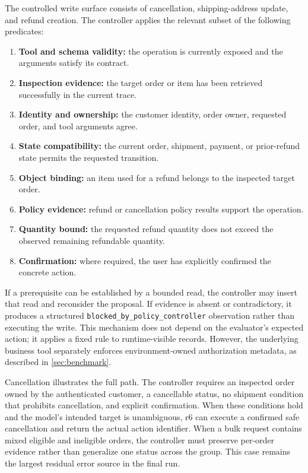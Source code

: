 \documentclass[11pt]{article}
\begin{document}
The controlled write surface consists of cancellation, shipping-address update, and refund creation. The controller applies the relevant subset of the following predicates:

\begin{enumerate}
  \item \textbf{Tool and schema validity:} the operation is currently exposed and the arguments satisfy its contract.
  \item \textbf{Inspection evidence:} the target order or item has been retrieved successfully in the current trace.
  \item \textbf{Identity and ownership:} the customer identity, order owner, requested order, and tool arguments agree.
  \item \textbf{State compatibility:} the current order, shipment, payment, or prior-refund state permits the requested transition.
  \item \textbf{Object binding:} an item used for a refund belongs to the inspected target order.
  \item \textbf{Policy evidence:} refund or cancellation policy results support the operation.
  \item \textbf{Quantity bound:} the requested refund quantity does not exceed the observed remaining refundable quantity.
  \item \textbf{Confirmation:} where required, the user has explicitly confirmed the concrete action.
\end{enumerate}

If a prerequisite can be established by a bounded read, the controller may insert that read and reconsider the proposal. If evidence is absent or contradictory, it produces a structured \texttt{blocked\_by\_policy\_controller} observation rather than executing the write. This mechanism does not depend on the evaluator's expected action; it applies a fixed rule to runtime-visible records. However, the underlying business tool separately enforces environment-owned authorization metadata, as described in \cref{sec:benchmark}.

Cancellation illustrates the full path. The controller requires an inspected order owned by the authenticated customer, a cancellable status, no shipment condition that prohibits cancellation, and explicit confirmation. When these conditions hold and the model's intended target is unambiguous, r6 can execute a confirmed safe cancellation and return the actual action identifier. When a bulk request contains mixed eligible and ineligible orders, the controller must preserve per-order evidence rather than generalize one status across the group. This case remains the largest residual error source in the final run.
\end{document}
